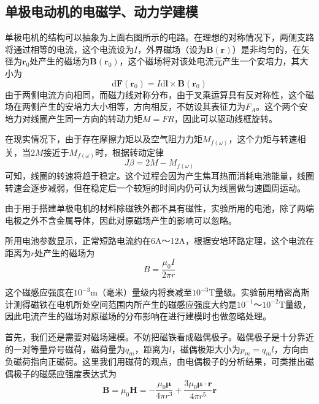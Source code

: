 \documentclass{CLGPY}
\begin{document}
\begin{multicols}{1}
\subsection{单极电动机的电磁学、动力学建模}
单极电机的结构可以抽象为上面右图所示的电路。在理想的对称情况下，两侧支路将通过相等的电流，这个电流设为$I$，外界磁场（设为$\bm{B}(\bm{r})$）是非均匀的，在矢径为$\bm{r}_0$处产生的磁场为$\bm{B}(\bm{r}_0)$，这个磁场将对该处电流元产生一个安培力，其大小为
\begin{equation}
\text{d}\bm{F}(\bm{r}_0)=I\text{d}\bm{l}\times\bm{B}(\bm{r}_0)
\end{equation}
由于两侧电流方向相同，而磁力线对称分布，由于叉乘运算具有反对称性，这个磁场在两侧产生的安培力大小相等，方向相反，不妨设其表征力为$F_A$。这个两个安培力对线圈产生同一方向的转动力矩$M=FR$，因此可以驱动线框旋转。


在现实情况下，由于存在摩擦力矩以及空气阻力力矩$M_{f(\omega)}$，这个力矩与转速相关，当$2M$接近于$M_{f(\omega)}$时，根据转动定律
\begin{equation}
J\beta=2M-M_{f(\omega)}
\end{equation}
可知，线圈的转速将趋于稳定。这个过程会因为产生焦耳热而消耗电池能量，线圈转速会逐步减弱，但在稳定后一个较短的时间内仍可认为线圈做匀速圆周运动。


由于用于搭建单极电机的材料除磁铁外都不具有磁性，实验所用的电池，除了两端电极之外不含金属导体，因此对原磁场产生的影响可以忽略。

所用电池参数显示，正常短路电流约在6A～12A，根据安培环路定理，这个电流在距离为$r$处产生的磁场为
\begin{equation}
B=\frac{\mu_{0} I}{2 \pi r}
\end{equation}

这个磁感应强度在$10^{-3}$m（毫米）量级内将衰减至$10^{-3}$T量级。实验前用精密高斯计测得磁铁在电机所处空间范围内所产生的磁感应强度大约是$10^{-1}$～$10^{-2}$T量级，因此电流产生的磁场对原磁场的分布影响在进行建模时也做忽略处理。

首先，我们还是需要对磁场建模。不妨把磁铁看成磁偶极子。磁偶极子是十分靠近的一对等量异号磁荷，磁荷量为$q_m$，距离为$l$，磁偶极矩大小为$p_m=q_ml$，方向由负磁荷指向正磁荷。这里我们用磁荷的观点，由电偶极子的分析结果，可类推出磁偶极子的磁感应强度表达式为
\begin{equation}
\boldsymbol{B}=\mu_{0} \boldsymbol{H}=-\frac{\mu_{0} \boldsymbol{\mu}}{4 \pi r^{3}}+\frac{3 \mu_{0} \boldsymbol{\mu} \cdot \boldsymbol{r}}{4 \pi r^{5}} \boldsymbol{r}
\end{equation}


\end{multicols}
\end{document}
